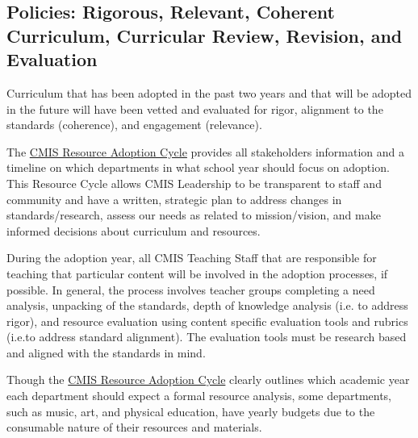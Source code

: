 \subsection{Policies: Rigorous, Relevant, Coherent Curriculum, Curricular Review, Revision, and Evaluation}



\begin{findings}
Curriculum that has been adopted in the past two years and that will be adopted in the future will have been vetted and evaluated for rigor, alignment to the standards (coherence), and engagement (relevance). 


The \href{https://docs.google.com/a/cmis.ac.th/document/d/1hh1nLUlJgg1hd7s6aG3u3We0L6o7Wg_ECdjc2f6DcT8/edit?usp=sharing}{CMIS Resource Adoption Cycle} provides all stakeholders information and a timeline on which departments in what school year should focus on adoption. This Resource Cycle allows CMIS Leadership to be transparent to staff and community and have a written, strategic plan to address changes in standards/research, assess our needs as related to mission/vision, and make informed decisions about curriculum and resources. 

During the adoption year, all CMIS Teaching Staff that are responsible for teaching that particular content will be involved in the adoption processes, if possible. In general, the process involves teacher groups completing a need analysis, unpacking of the standards, depth of knowledge analysis (i.e. to address rigor), and resource evaluation using content specific evaluation tools and rubrics (i.e.to address standard alignment). The evaluation tools must be research based and aligned with the standards in mind. 

Though the \href{https://docs.google.com/a/cmis.ac.th/document/d/1hh1nLUlJgg1hd7s6aG3u3We0L6o7Wg_ECdjc2f6DcT8/edit?usp=sharing}{CMIS Resource Adoption Cycle} clearly outlines which academic year each department should expect a formal resource analysis, some departments, such as music, art, and physical education, have yearly budgets due to the consumable nature of their resources and materials. 


\end{findings}
